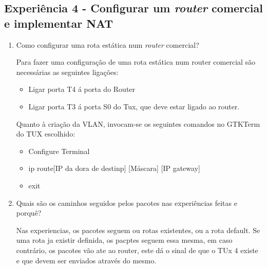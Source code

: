 \documentclass{article}
\begin{document}
\subsection{Experiência 4 - Configurar um \textit{router} comercial e implementar NAT}
\begin{enumerate}
\item Como configurar uma rota estática num \textit{router} comercial?

Para fazer uma configuração de uma rota estática num router comercial são necessárias as seguintes ligações:
\begin{itemize}
    \item Ligar porta T4 á porta do Router
    \item Ligar porta T3 á porta S0 do Tux, que deve estar ligado ao router.
\end{itemize}
Quanto à criação da VLAN, invocam-se os seguintes comandos no GTKTerm do TUX escolhido:
\begin{itemize}
    \item Configure Terminal
    \item ip route[IP da dora de destinp] [Máscara] [IP gateway]
    \item exit
\end{itemize}


\item Quais são os caminhos seguidos pelos pacotes nas experiências feitas e porquê?

Nas experiencias, os pacotes seguem ou rotas existentes, ou a rota default.
Se uma rota ja existir definida, os pacptes seguem essa mesma, em caso contrário, os pacotes vão ate ao router, este dá o sinal de que o TUx 4 existe e que devem ser enviados através do mesmo.


\end{enumerate}
\end{document}
